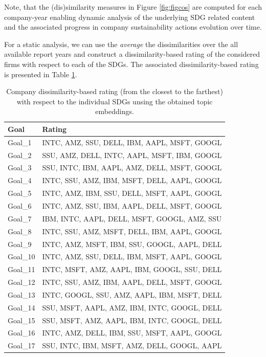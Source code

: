 \documentclass[
]{article}
\begin{document}
Note, that the (dis)similarity measures in Figure \ref{fig:figcos} are computed for each company-year enabling dynamic analysis of the underlying SDG related content and the associated progress in company sustainability actions evolution over time.

For a static analysis, we can use the \emph{average} the dissimilarities over the all available report years and construct a dissimilarity-based rating of the considered firms with respect to each of the SDGs. The associated dissimilarity-based rating is presented in Table \ref{tab:tab01}.

\begin{table}

\caption{\label{tab:tab01}Company dissimilarity-based rating (from the closest to the farthest) with respect to the individual SDGs unsing the obtained topic embeddings.}
\centering
\begin{tabular}[t]{l|l}
\hline
Goal & Rating\\
\hline
Goal\_1 & INTC, AMZ, SSU, DELL, IBM, AAPL, MSFT, GOOGL\\
\hline
Goal\_2 & SSU, AMZ, DELL, INTC, AAPL, MSFT, IBM, GOOGL\\
\hline
Goal\_3 & SSU, INTC, IBM, AAPL, AMZ, DELL, MSFT, GOOGL\\
\hline
Goal\_4 & INTC, SSU, AMZ, IBM, MSFT, DELL, AAPL, GOOGL\\
\hline
Goal\_5 & INTC, AMZ, IBM, SSU, DELL, MSFT, AAPL, GOOGL\\
\hline
Goal\_6 & INTC, AMZ, SSU, IBM, AAPL, DELL, MSFT, GOOGL\\
\hline
Goal\_7 & IBM, INTC, AAPL, DELL, MSFT, GOOGL, AMZ, SSU\\
\hline
Goal\_8 & INTC, SSU, AMZ, MSFT, DELL, IBM, AAPL, GOOGL\\
\hline
Goal\_9 & INTC, AMZ, MSFT, IBM, SSU, GOOGL, AAPL, DELL\\
\hline
Goal\_10 & INTC, AMZ, SSU, DELL, IBM, MSFT, AAPL, GOOGL\\
\hline
Goal\_11 & INTC, MSFT, AMZ, AAPL, IBM, GOOGL, SSU, DELL\\
\hline
Goal\_12 & INTC, SSU, AMZ, IBM, AAPL, DELL, MSFT, GOOGL\\
\hline
Goal\_13 & INTC, GOOGL, SSU, AMZ, AAPL, IBM, MSFT, DELL\\
\hline
Goal\_14 & SSU, MSFT, AAPL, AMZ, IBM, INTC, GOOGL, DELL\\
\hline
Goal\_15 & SSU, MSFT, AMZ, AAPL, IBM, INTC, GOOGL, DELL\\
\hline
Goal\_16 & INTC, AMZ, DELL, IBM, SSU, MSFT, AAPL, GOOGL\\
\hline
Goal\_17 & SSU, INTC, IBM, MSFT, AMZ, DELL, GOOGL, AAPL\\
\hline
\end{tabular}
\end{table}
\end{document}
